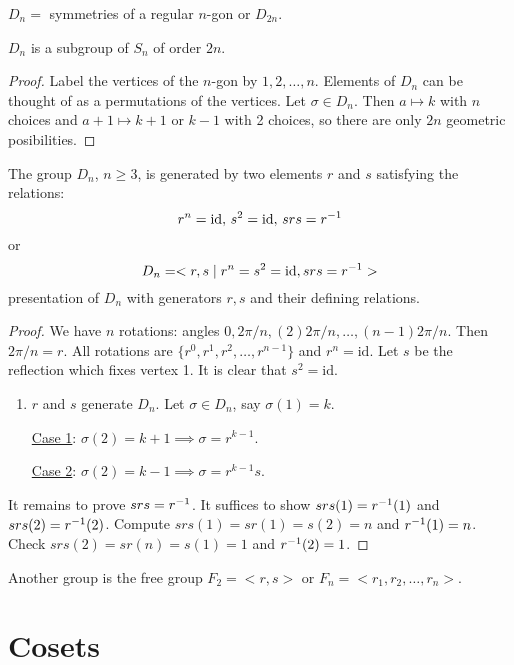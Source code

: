 \documentclass[]{article}
\begin{document}
$D_n =$ symmetries of a regular $n$-gon or $D_{2n}$.
\begin{theorem}
	$D_n$ is a subgroup of $S_n$ of order $2n$.
\end{theorem}
\begin{proof}
	Label the vertices of the $n$-gon by $1,2,\dots,n$. Elements of $D_n$ can be thought of as a permutations of the vertices.
	Let $\sigma\in D_n$. Then $a\mapsto k$ with $n$ choices and $a+1\mapsto k+1$ or $k-1$ with 2 choices, so there are only $2n$ geometric posibilities.
\end{proof}
\begin{theorem}
	The group $D_n$, $n\geq 3$, is generated by two elements $r$ and $s$ satisfying the relations: $$r^n = \text{id},\,s^2 = \text{id},\,srs = r^{-1}$$
	or $$ D_n = < r,s\mid r^n = s^2 = \text{id},srs = r^{-1}>$$ presentation of $D_n$ with generators $r,s$ and their defining relations.
\end{theorem}
\begin{proof}
	We have $n$ rotations: angles $0,2\pi/n,(2)2\pi/n,\dots,(n-1)2\pi/n$. Then $2\pi/n = r$. All rotations are $\{r^0,r^1,r^2,\dots,r^{n-1}\}$ and $r^n = \text{id}$.
	Let $s$ be the reflection which fixes vertex 1.
	It is clear that $s^2 = \text{id}$.
	\begin{enumerate}
		\item $r$ and $s$ generate $D_n$. Let $\sigma\in D_n$, say $\sigma(1) = k$.
			
			\ul{Case 1}: $\sigma(2) = k+1 \implies \sigma = r^{k-1}$.
			
			\ul{Case 2}: $\sigma(2) = k-1 \implies \sigma = r^{k-1}s$.
	\end{enumerate}
	It remains to prove $srs = r^{-1}$. It suffices to show $srs(1) = r^{-1}(1)$ and $srs(2) = r^{-1}(2)$.
	Compute $srs(1) = sr(1) = s(2) = n$ and $r^{-1}(1) = n$.
	Check $srs(2) = sr(n) = s(1) = 1$ and $r^{-1}(2) = 1$.
\end{proof}
Another group is the free group $F_2 = <r,s>$ or $F_n = < r_1,r_2,\dots,r_n>$.

\section{Cosets}
\end{document}
